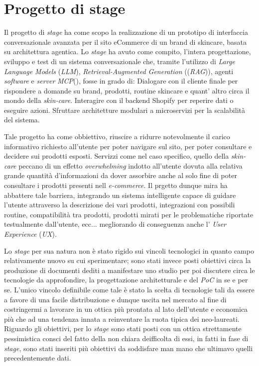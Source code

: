 \section{Progetto di stage}

Il progetto di \emph{stage} ha come scopo la realizzazione di un prototipo di interfaccia conversazionale
avanzata per il sito eCommerce di un brand di skincare, basata su architettura agentica.
Lo \emph{stage} ha avuto come compito, l'intera progettazione, sviluppo e test di un sistema conversazionale che, tramite l'utilizzo
di \emph{Large Language Models} (\emph{LLM}), \emph{Retrieval-Augmented Generation} ((\emph{RAG})), agenti \emph{software} e \emph{server} \emph{MCP}(), fosse in grado di:
Dialogare con il cliente finale per rispondere a domande su brand, prodotti, routine skincare e quant' altro circa il mondo della \emph{skin-care}.
Interagire con il backend Shopify per reperire dati o eseguire azioni.
Sfruttare architetture modulari a microservizi per la scalabilità del sistema.

Tale progetto ha come obbiettivo, riuscire a ridurre notevolmente il carico informativo richiesto all'utente per poter navigare sul sito, per poter consultare e decidere sui prodotti esposti.
Servizzi come nel caso specifico, quello della \emph{skin-care} peccano di un effetto \emph{overwhelming} indotto all'utente dovuta alla relativa grande quantità d'informazioni da dover assorbire
anche al solo fine di poter consultare i prodotti presenti nell \emph{e-commerce}.
Il prgetto dunque mira ha abbattere tale barriera, integrando un sistema intelligente capace di guidare l'utente attraverso la descrizione dei vari prodotti, integrazioni con possibili routine, 
compatibilità tra prodotti, prodotti mirati per le problematiche riportate testualmente dall'utente, ecc... megliorando di conseguenza anche l' \emph{User Experience} (\emph{UX}).


Lo \emph{stage} per sua natura non è stato rigido sui vincoli tecnologici in quanto campo relativamente nuovo su cui sperimentare; sono stati invece posti obiettivi circa la produzione di 
documenti dediti a manifestare uno studio per poi discutere circa le tecnologie da approfondire, la progettazione architetturale e del \emph{PoC} in se e per se.
L'unico vincolo definibile come tale è stato la scelta di tecnologie tali da essere a favore di una facile distribuzione e dunque uscita nel mercato al fine di costringermi a lavorare in un 
ottica più prontata al lato dell'utente e economica più che ad una tendenza innata a reinventare la ruota tipica dei neo-laureati.
Riguardo gli obiettivi, per lo \emph{stage} sono stati posti con un ottica strettamente pessimistica consci del fatto della non chiara deifficolta di essi, in fatti in fase di \emph{stage},
sono stati inseriti più obiettivi da soddisfare man mano che ultimavo quelli precedentemente dati.

